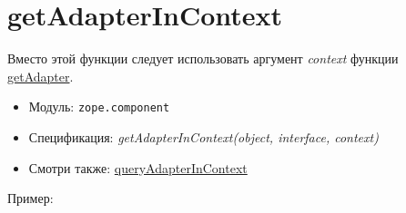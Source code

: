 \documentclass[a4paper,openany,twoside,final]{book}
\providecommand*{\DUroletitlereference}[1]{\textsl{#1}}
\begin{document}
\section*{getAdapterInContext%
  \label{getadapterincontext}%
}

Вместо этой функции следует использовать аргумент \DUroletitlereference{context} функции \hyperref[getadapter]{getAdapter}.

\begin{itemize}

\item Модуль: \texttt{zope.component}

\item Спецификация: \DUroletitlereference{getAdapterInContext(object, interface, context)}

\item Смотри также: \hyperref[queryadapterincontext]{queryAdapterInContext}

\end{itemize}

Пример:
\end{document}
